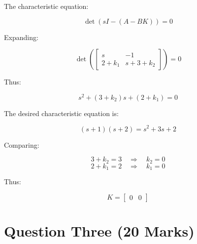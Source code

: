 \documentclass[12pt]{article}
\begin{document}
	The characteristic equation:
	
	\[
	\det(sI - (A - BK)) = 0
	\]
	
	Expanding:
	
	\[
	\det\left(
	\begin{bmatrix}
		s & -1 \\ 
		2+k_1 & s+3+k_2
	\end{bmatrix}
	\right) = 0
	\]
	
	Thus:
	
	\[
	s^2 + (3+k_2)s + (2+k_1) = 0
	\]
	
	The desired characteristic equation is:
	
	\[
	(s+1)(s+2) = s^2 + 3s + 2
	\]
	
	Comparing:
	
	\[
	3 + k_2 = 3 \quad \Rightarrow \quad k_2 = 0
	\]
	\[
	2 + k_1 = 2 \quad \Rightarrow \quad k_1 = 0
	\]
	
	Thus:
	
	\[
	\boxed{K = \begin{bmatrix} 0 & 0 \end{bmatrix}}
	\]
	
	
	
	
	
	
	\section*{Question Three \hfill (20 Marks)}
	
\end{document}
